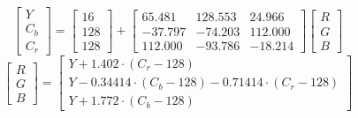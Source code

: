 \begin{equation}
\begin{bmatrix}
    Y \\
    C_b \\
    C_r 
\end{bmatrix} =
 \begin{bmatrix}
    16  \\
    128 \\
    128
\end{bmatrix}
+
 \begin{bmatrix}
    65.481 & 128.553 & 24.966 \\
    -37.797 & -74.203 & 112.000 \\
    112.000 & -93.786 & -18.214 
\end{bmatrix}
\begin{bmatrix}
   R \\
   G \\
   B 
\end{bmatrix}
\end{equation}
\begin{equation}
\begin{bmatrix}
    R \\
    G \\
    B 
\end{bmatrix} =
 \begin{bmatrix}
    Y + 1.402 \cdot (C_r - 128) \\
    Y -0.34414 \cdot (C_b - 128) - 0.71414 \cdot (C_r - 128) \\
    Y + 1.772 \cdot  (C_b - 128) 
\end{bmatrix}
\end{equation}




